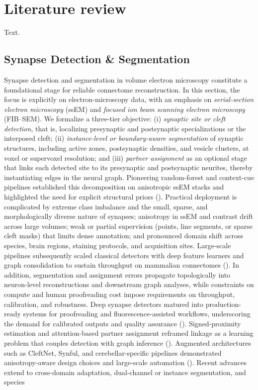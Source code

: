 \chapter{Literature review\label{cha:litreivew}}

Text.

\section{Synapse Detection \& Segmentation}

Synapse detection and segmentation in volume electron microscopy constitute a foundational stage for reliable connectome reconstruction. In this section, the focus is explicitly on electron‐microscopy data, with an emphasis on \emph{serial-section electron microscopy} (ssEM) and \emph{focused ion beam scanning electron microscopy} (FIB--SEM). We formalize a three-tier objective: (i) \emph{synaptic site or cleft detection}, that is, localizing presynaptic and postsynaptic specializations or the interposed cleft; (ii) \emph{instance-level or boundary-aware segmentation} of synaptic structures, including active zones, postsynaptic densities, and vesicle clusters, at voxel or supervoxel resolution; and (iii) \emph{partner assignment} as an optional stage that links each detected site to its presynaptic and postsynaptic neurites, thereby instantiating edges in the neural graph. Pioneering random-forest and context-cue pipelines established this decomposition on anisotropic ssEM stacks and highlighted the need for explicit structural priors (\cite{Kreshuk2011PLOS,Becker2012MICCAI,Becker2013TMI,Kreshuk2014PLOS}). Practical deployment is complicated by extreme class imbalance and the small, sparse, and morphologically diverse nature of synapses; anisotropy in ssEM and contrast drift across large volumes; weak or partial supervision (points, line segments, or sparse cleft masks) that limits dense annotation; and pronounced domain shift across species, brain regions, staining protocols, and acquisition sites. Large-scale pipelines subsequently scaled classical detectors with deep feature learners and graph consolidation to sustain throughput on mammalian connectomes (\cite{Huang2014DAWMR,Roncal2015VESICLE,Li2018BMC}). In addition, segmentation and assignment errors propagate topologically into neuron-level reconstructions and downstream graph analyses, while constraints on compute and human proofreading cost impose requirements on throughput, calibration, and robustness. Deep synapse detectors matured into production-ready systems for proofreading and fluorescence-assisted workflows, underscoring the demand for calibrated outputs and quality assurance (\cite{Staffler2017SynEM,Simhal2017PCBiol,Huang2018FullAuto}). Signed-proximity estimation and attention-based partner assignment reframed linkage as a learning problem that couples detection with graph inference (\cite{Parag2018SignedProximity,Turner2019AVAN}). Augmented architectures such as CleftNet, Synful, and cerebellar-specific pipelines demonstrated anisotropy-aware design choices and large-scale automation (\cite{Liu2021CleftNet,Buhmann2021Synful,Park2022Cerebellar}). Recent advances extend to cross-domain adaptation, dual-channel or instance segmentation, and species 